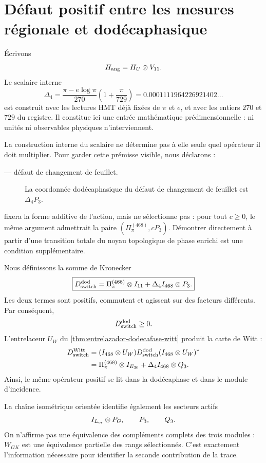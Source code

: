 \section{Défaut positif entre les mesures régionale et dodécaphasique}

Écrivons
\[
 H_{\rm ang}=H_U\otimes V_{11}.
\]
Le scalaire interne
\[
 \Delta_4
 =\frac{\pi-e\log\pi}{270}
 \left(1+\frac\pi{729}\right)
 =0.0001111964226921402\ldots
\]
est construit avec les lectures HMT déjà fixées de \(\pi\) et \(e\), et avec les
entiers \(270\) et \(729\) du registre. Il constitue ici une entrée mathématique
prédimensionnelle : ni unités ni observables physiques n’interviennent.

La construction interne du scalaire ne détermine pas à elle seule quel opérateur
il doit multiplier. Pour garder cette prémisse visible, nous déclarons :
\begin{description}
  \item[\HDef --- défaut de changement de feuillet.] La coordonnée dodécaphasique du défaut
  de changement de feuillet est \(\Delta_4P_3\).
\end{description}
\HAdd fixera la forme additive de l’action, mais ne sélectionne pas \HDef : pour tout
\(c\ge0\), le même argument admettrait la paire
\((\Pi_\pi^{(468)},cP_3)\). Démontrer \HDef directement à partir d’une transition
totale du noyau topologique de phase enrichi est une condition supplémentaire.

Nous définissons la somme de Kronecker
\[
 \boxed{
 D_{\rm switch}^{\rm dod}
 =\Pi_\pi^{(468)}\otimes I_{11}
 +\Delta_4 I_{468}\otimes P_3.
 }
\]
Les deux termes sont positifs, commutent et agissent sur des facteurs différents.
Par conséquent,
\[
 D_{\rm switch}^{\rm dod}\ge0.
\]
L’entrelaceur \(U_W\) du
\cref{thm:entrelazador-dodecafase-witt} produit la carte de Witt :
\[
\begin{aligned}
 D_{\rm switch}^{\rm Witt}
 &=(I_{468}\otimes U_W)
 D_{\rm switch}^{\rm dod}
 (I_{468}\otimes U_W)^*\\
 &=\Pi_\pi^{(468)}\otimes I_{E_{30}}
 +\Delta_4I_{468}\otimes Q_3.
\end{aligned}
\]
Ainsi, le même opérateur positif se lit dans la dodécaphase et dans le module
d’incidence.

La chaîne isométrique orientée identifie également les secteurs actifs
\[
 I_{L_{\rm or}}\otimes P_G,\qquad P_3,\qquad Q_3.
\]
On n’affirme pas une équivalence des compléments complets des trois
modules : \(W_{GK}\) est une équivalence partielle des rangs
sélectionnés. C’est exactement l’information nécessaire pour identifier
la seconde contribution de la trace.

